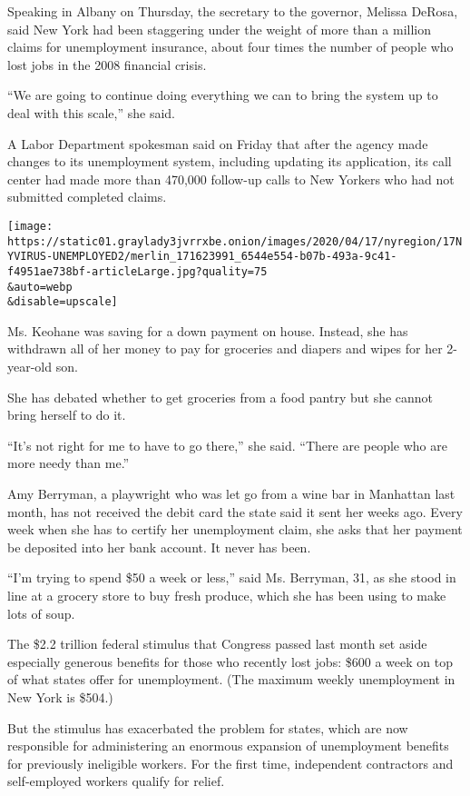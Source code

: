 Speaking in Albany on Thursday, the secretary to the governor, Melissa
DeRosa, said New York had been staggering under the weight of more than
a million claims for unemployment insurance, about four times the number
of people who lost jobs in the 2008 financial crisis.

``We are going to continue doing everything we can to bring the system
up to deal with this scale,'' she said.

A Labor Department spokesman said on Friday that after the agency made
changes to its unemployment system, including updating its application,
its call center had made more than 470,000 follow-up calls to New
Yorkers who had not submitted completed claims.

\texttt{[image: https://static01.graylady3jvrrxbe.onion/images/2020/04/17/nyregion/17NYVIRUS-UNEMPLOYED2/merlin\_171623991\_6544e554-b07b-493a-9c41-f4951ae738bf-articleLarge.jpg?quality=75\\\&auto=webp\\\&disable=upscale]}

Ms. Keohane was saving for a down payment on house. Instead, she has
withdrawn all of her money to pay for groceries and diapers and wipes
for her 2-year-old son.

She has debated whether to get groceries from a food pantry but she
cannot bring herself to do it.

``It's not right for me to have to go there,'' she said. ``There are
people who are more needy than me.''

Amy Berryman, a playwright who was let go from a wine bar in Manhattan
last month, has not received the debit card the state said it sent her
weeks ago. Every week when she has to certify her unemployment claim,
she asks that her payment be deposited into her bank account. It never
has been.

``I'm trying to spend \$50 a week or less,'' said Ms. Berryman, 31, as
she stood in line at a grocery store to buy fresh produce, which she has
been using to make lots of soup.

The \$2.2 trillion federal stimulus that Congress passed last month set
aside especially generous benefits for those who recently lost jobs:
\$600 a week on top of what states offer for unemployment. (The maximum
weekly unemployment in New York is \$504.)

But the stimulus has exacerbated the problem for states, which are now
responsible for administering an enormous expansion of unemployment
benefits for previously ineligible workers. For the first time,
independent contractors and self-employed workers qualify for relief.

